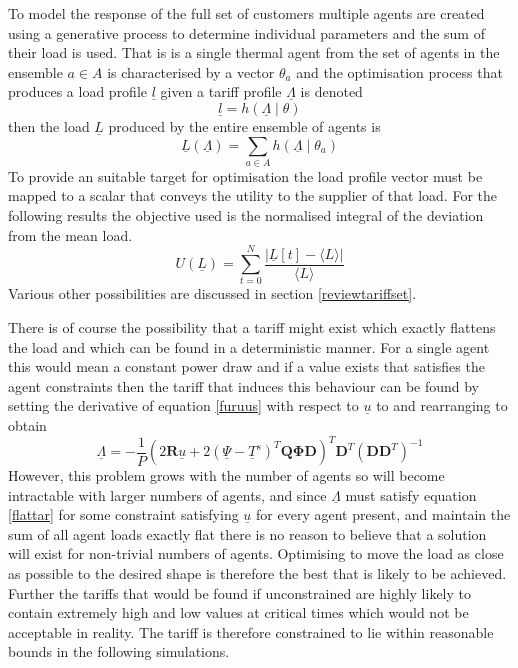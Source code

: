 \documentclass[a4paper, 10 pt, conference]{ieeeconf}  %
\begin{document}
To model the response of the full set of customers multiple agents are created using a generative process to determine individual parameters and the sum of their load is used. That is is a single thermal agent from the set of agents in the ensemble $a \in A$ is characterised by a vector $\theta_{a}$ and the optimisation process that produces a load profile $\underline{l}$ given a tariff profile $\underline{\Lambda}$ is denoted
\begin{equation}
\underline{l}=h(\underline{\Lambda} \mid \theta)
\end{equation}
then the load $\underline{L}$ produced by the entire ensemble of agents is
\begin{equation}
\underline{L}(\underline{\Lambda}) = \sum_{a \in A} h(\underline{\Lambda} \mid \theta_{a})
\end{equation}
To provide an suitable target for optimisation the load profile vector must be mapped to a scalar that conveys the utility to the supplier of that load. For the following results the objective used is the normalised integral of the deviation from the mean load.
\begin{equation}
U(\underline{L})=\sum_{t=0}^{N} \frac{\left| \underline{L}[t]-\langle L \rangle \right|}{\langle L \rangle}
\end{equation}
Various other possibilities are discussed in section \ref{reviewtariffset}.

There is of course the possibility that a tariff might exist which exactly flattens the load and which can be found in a deterministic manner. For a single agent this would mean a constant power draw and if a value exists that satisfies the agent constraints then the tariff that induces this behaviour can be found by setting the derivative of equation \ref{furuus} with respect to $\underline{u}$ to and rearranging to obtain
\begin{equation}
\label{flattar}
\underline{\Lambda} = -\frac{1}{P}\left( 2\mathbf{R}\underline{u} + 2(\underline{\Psi}-\underline{T}^s)^{T}\mathbf{Q}\boldsymbol{\Phi}\mathbf{D}\right)^{T}\mathbf{D}^T(\mathbf{DD}^{T})^{-1}
\end{equation}
However, this problem grows with the number of agents so will become intractable with larger numbers of agents, and since $\underline{\Lambda}$ must satisfy equation \ref{flattar} for some constraint satisfying $\underline{u}$ for every agent present, and maintain the sum of all agent loads exactly flat there is no reason to believe that a solution will exist for non-trivial numbers of agents. Optimising to move the load as close as possible to the desired shape is therefore the best that is likely to be achieved. Further the tariffs that would be found if unconstrained are highly likely to contain extremely high and low values at critical times which would not be acceptable in reality. The tariff is therefore constrained to lie within reasonable bounds in the following simulations.
\end{document}
